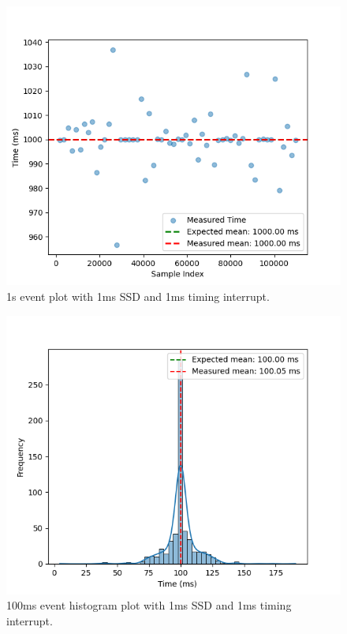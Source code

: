 \begin{figure}[h]
\begin{minipage}{0.5\textwidth}
    \includegraphics[width=1\linewidth]{figures/scatter_1000ssd_1s_new.png}
    \caption{1s event plot with 1ms SSD and 1ms timing interrupt.} 
    \label{fig:1s_after}
  \end{minipage}
\end{figure}


\begin{figure}[h]
  \centering
  \begin{minipage}{0.49\textwidth}
    \centering
    \includegraphics[width=1\linewidth]{figures/100ms_histogram_plot_new.png}
    \caption{100ms event histogram plot with 1ms SSD and 1ms timing interrupt.} 
    \label{fig:histogram_after}
  \end{minipage}
\end{figure}

